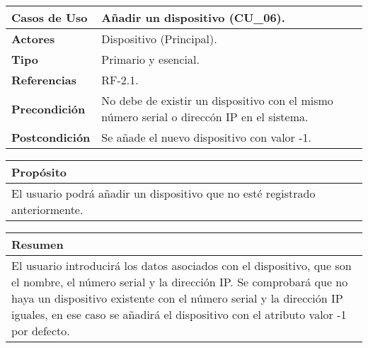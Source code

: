 \begin{itemize}
    \begin{table}[h!]
        \centering
        \begin{tabular}{|l|p{}|}
            \hline
            \textbf{Casos de Uso}   &   Añadir un dispositivo (CU\_06). \\
            \hline 
            \textbf{Actores}        &   Dispositivo (Principal). \\ 
            \hline 
            \textbf{Tipo}           &   Primario y esencial. \\ 
            \hline
            \textbf{Referencias}    &   RF-2.1. \\ 
            \hline
            \textbf{Precondición}   &   No debe de existir un dispositivo con el mismo número serial o direccón IP en el sistema. \\ 
            \hline
            \textbf{Postcondición}  &   Se añade el nuevo dispositivo con valor -1. \\ 
            \hline
        \end{tabular}
        
        \vspace{5mm}
        
        \begin{tabular}{|p{\textwidth}|}
            \hline
            \rowcolor{SeaGreen} \textbf{Propósito} \\
            \hline
            \multicolumn{1}{|p{12cm}|}{El usuario podrá añadir un dispositivo que no esté registrado anteriormente.} \\ [0.5ex]
            \hline
        \end{tabular}
        
        \vspace{5mm}
        
        \begin{tabular}{|p{\textwidth}|}
            \hline
            \rowcolor{SeaGreen} \textbf{Resumen} \\
            \hline
            \multicolumn{1}{|p{12cm}|}{El usuario introducirá los datos asociados con el dispositivo, que son el nombre, el número serial 
            y la dirección IP. Se comprobará que no haya un dispositivo existente con el número serial y la dirección IP iguales, en ese 
            caso se añadirá el dispositivo con el atributo valor -1 por defecto.} \\ [0.5ex]
            \hline
        \end{tabular}
        

\end{table}
\end{itemize}

